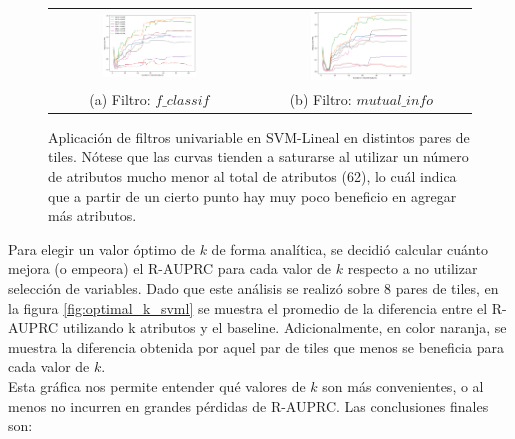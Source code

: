 \begin{figure}[h!]
\begin{tabular}{cc}
  \includegraphics[width=0.49\textwidth]{Kap5/linear_f_classif_ALL_CURVES.png} &   \includegraphics[width=0.49\textwidth]{Kap5/linear_mutual_info_classif_ALL_CURVES.png} \\
(a) Filtro: $f\_classif$ & (b) Filtro: $mutual\_info$
\end{tabular}
\caption{Aplicación de filtros univariable en SVM-Lineal en distintos pares de tiles. Nótese que las curvas tienden a saturarse al utilizar un número de atributos mucho menor al total de atributos (62), lo cuál indica que a partir de un cierto punto hay muy poco beneficio en agregar más atributos. }
\label{fig:svml_univariate_unified}
\end{figure}

Para elegir un valor óptimo de $k$ de forma analítica, se decidió calcular cuánto mejora (o empeora) el R-AUPRC para cada valor de $k$ respecto a no utilizar selección de variables. Dado que este análisis se realizó sobre 8 pares de tiles, en la figura \ref{fig:optimal_k_svml} se muestra el promedio de la diferencia entre el R-AUPRC utilizando k atributos y el baseline. Adicionalmente, en color naranja, se muestra la diferencia obtenida por aquel par de tiles que menos se beneficia para cada valor de $k$. \\

Esta gráfica nos permite entender qué valores de $k$ son más convenientes, o al menos no incurren en grandes pérdidas de R-AUPRC. Las conclusiones finales son:

